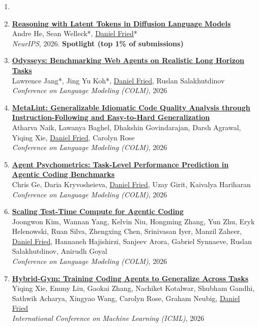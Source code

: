 \begin{enumerate}[leftmargin=-1mm,partopsep=0pt]
\item[]

\item \href{https://arxiv.org/abs/2602.03769}{\textbf{Reasoning with Latent Tokens in Diffusion Language Models}} \\
  Andre He, Sean Welleck*, \underline{Daniel Fried}*\\
  \emph{NeurIPS}, 2026. \textbf{Spotlight (top 1\% of submissions)}

\item \href{https://arxiv.org/abs/2604.24964}{\textbf{Odysseys: Benchmarking Web Agents on Realistic Long Horizon Tasks}} \\
  Lawrence Jang*, Jing Yu Koh*, \underline{Daniel Fried}, Ruslan Salakhutdinov\\
  \emph{Conference on Language Modeling (COLM)}, 2026

\item \href{https://arxiv.org/abs/2507.11687}{\textbf{MetaLint: Generalizable Idiomatic Code Quality Analysis through Instruction-Following and Easy-to-Hard Generalization}} \\
  Atharva Naik, Lawanya Baghel, Dhakshin Govindarajan, Darsh Agrawal, Yiqing Xie, \underline{Daniel Fried}, Carolyn Rose\\
  \emph{Conference on Language Modeling (COLM)}, 2026

\item \href{https://arxiv.org/abs/2604.00594}{\textbf{Agent Psychometrics: Task-Level Performance Prediction in Agentic Coding Benchmarks}} \\
  Chris Ge, Daria Kryvosheieva, \underline{Daniel Fried}, Uzay Girit, Kaivalya Hariharan\\
  \emph{Conference on Language Modeling (COLM)}, 2026

\item \href{https://arxiv.org/abs/2604.16529}{\textbf{Scaling Test-Time Compute for Agentic Coding}} \\
  Joongwon Kim, Wannan Yang, Kelvin Niu, Hongming Zhang, Yun Zhu, Eryk Helenowski, Ruan Silva, Zhengxing Chen, Srinivasan Iyer, Manzil Zaheer, \underline{Daniel Fried}, Hannaneh Hajishirzi, Sanjeev Arora, Gabriel Synnaeve, Ruslan Salakhutdinov, Anirudh Goyal\\
  \emph{Conference on Language Modeling (COLM)}, 2026

\item \href{https://arxiv.org/abs/2602.16819}{\textbf{Hybrid-Gym: Training Coding Agents to Generalize Across Tasks}} \\
  Yiqing Xie, Emmy Liu, Gaokai Zhang, Nachiket Kotalwar, Shubham Gandhi, Sathwik Acharya, Xingyao Wang, Carolyn Rose, Graham Neubig, \underline{Daniel Fried}\\
  \emph{International Conference on Machine Learning (ICML)}, 2026


\end{enumerate}
